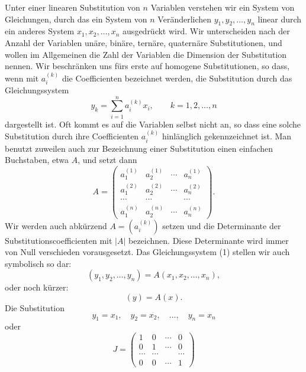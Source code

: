 \documentclass[11pt]{article}
\begin{document}
Unter einer linearen Substitution von $n$ Variablen verstehen wir ein System von Gleichungen, durch das ein System von $n$ Veränderlichen $y_1,y_2,\ldots,y_n$ linear durch ein anderes System $x_1,x_2,\ldots,x_n$ ausgedrückt wird. Wir unterscheiden nach der Anzahl der Variablen unäre, binäre, ternäre, quaternäre Substitutionen, und wollen im Allgemeinen die Zahl der Variablen die Dimension der Substitution nennen. Wir beschränken uns fürs erste auf homogene Substitutionen, so dass, wenn mit $a_i^{(k)}$ die Coefficienten bezeichnet werden, die Substitution durch das Gleichungssystem
\begin{equation}
y_k=\sum_{i=1}^{n} a_i^{(k)}x_i,\qquad k=1,2,\ldots,n
\tag{1}
\end{equation}
dargestellt ist. Oft kommt es auf die Variablen selbst nicht an, so dass eine solche Substitution durch ihre Coefficienten $a_i^{(k)}$ hinlänglich gekennzeichnet ist. Man benutzt zuweilen auch zur Bezeichnung einer Substitution einen einfachen Buchstaben, etwa $A$, und setzt dann
\begin{equation}
A=\begin{pmatrix}
a_1^{(1)}&a_2^{(1)}&\cdots&a_n^{(1)}\\
a_1^{(2)}&a_2^{(2)}&\cdots&a_n^{(2)}\\
\cdots&\cdots&&\cdots\\
a_1^{(n)}&a_2^{(n)}&\cdots&a_n^{(n)}
\end{pmatrix}.
\tag{2}
\end{equation}
Wir werden auch abkürzend $A=(a_i^{(k)})$ setzen und die Determinante der Substitutionscoefficienten mit $|A|$ bezeichnen. Diese Determinante wird immer von Null verschieden vorausgesetzt. Das Gleichungssystem (1) stellen wir auch symbolisch so dar:
\begin{equation}
(y_1,y_2,\ldots,y_n)=A(x_1,x_2,\ldots,x_n),
\tag{3}
\end{equation}
oder noch kürzer:
\begin{equation}
(y)=A(x).
\tag{4}
\end{equation}
Die Substitution
\begin{equation}
y_1=x_1,\quad y_2=x_2,\quad \ldots,\quad y_n=x_n
\tag{5}
\end{equation}
oder
\begin{equation}
J=\begin{pmatrix}
1&0&\cdots&0\\
0&1&\cdots&0\\
\cdots&\cdots&&\cdots\\
0&0&\cdots&1
\end{pmatrix}
\tag{6}
\end{equation}
\end{document}
